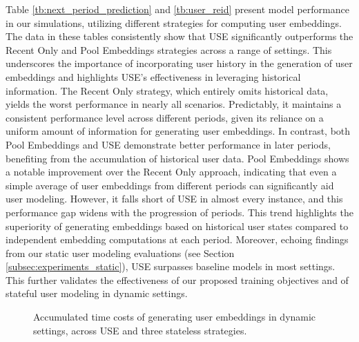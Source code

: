 \documentclass{article}
\begin{document}
Table \ref{tb:next_period_prediction} and \ref{tb:user_reid} present model performance in our simulations, utilizing different strategies for computing user embeddings. The data in these tables consistently show that USE significantly outperforms the Recent Only and Pool Embeddings strategies across a range of settings. This underscores the importance of incorporating user history in the generation of user embeddings and highlights USE’s effectiveness in leveraging historical information. The Recent Only strategy, which entirely omits historical data,  yields the worst performance in nearly all scenarios. Predictably, it maintains a consistent performance level across different periods, given its reliance on a uniform amount of information for generating user embeddings.
In contrast, both Pool Embeddings and USE demonstrate better performance in later periods, benefiting from the accumulation of historical user data. Pool Embeddings shows a notable improvement over the Recent Only approach, indicating that even a simple average of user embeddings from different periods can significantly aid user modeling. However, it falls short of USE in almost every instance, and this performance gap widens with the progression of periods. This trend highlights the superiority of generating embeddings based on historical user states compared to independent embedding computations at each period.
Moreover, echoing findings from our static user modeling evaluations (see Section \ref{subsec:experiments_static}), USE surpasses baseline models in most settings. This further validates the effectiveness of our proposed training objectives and of stateful user modeling in dynamic settings.

\begin{figure}
    \centering
		\caption{Accumulated time costs of generating user embeddings in dynamic settings, across USE and three stateless strategies.}
    \label{fig:stateful_stateless}
\end{figure}
\end{document}
